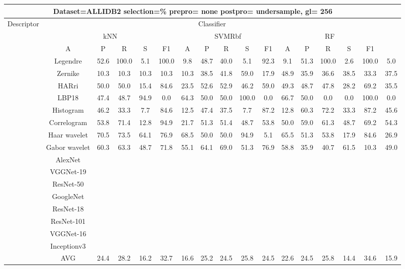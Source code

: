 \documentclass[12pt,italian]{article}
\begin{document}
\begin{tiny}
\begin{longtable}{lcccccccccccccccc}
\toprule
\multicolumn{16}{c}{Dataset=ALLIDB2 selection=\% prepro= none postpro= undersample, gl= 256} \\ 
\toprule
Descriptor & \multicolumn{15}{c}{Classifier} \\ 
& \multicolumn{5}{c}{kNN} & \multicolumn{5}{c}{SVMRbf} & \multicolumn{5}{c}{RF} \\ 
& A & P & R & S & F1 & A & P & R & S & F1 & A & P & R & S & F1 \\ 
\midrule
& Legendre & 52.6 & 100.0 &  5.1 & 100.0 &  9.8 & 48.7 & 40.0 &  5.1 & 92.3 &  9.1 & 51.3 & 100.0 &  2.6 & 100.0 &  5.0 \\ 
& Zernike & 10.3 & 10.3 & 10.3 & 10.3 & 10.3 & 38.5 & 41.8 & 59.0 & 17.9 & 48.9 & 35.9 & 36.6 & 38.5 & 33.3 & 37.5 \\ 
& HARri & 50.0 & 50.0 & 15.4 & 84.6 & 23.5 & 52.6 & 52.9 & 46.2 & 59.0 & 49.3 & 48.7 & 47.8 & 28.2 & 69.2 & 35.5 \\ 
& LBP18 & 47.4 & 48.7 & 94.9 &  0.0 & 64.3 & 50.0 & 50.0 & 100.0 &  0.0 & 66.7 & 50.0 &  0.0 &  0.0 & 100.0 &  0.0 \\ 
& Histogram & 46.2 & 33.3 &  7.7 & 84.6 & 12.5 & 47.4 & 37.5 &  7.7 & 87.2 & 12.8 & 60.3 & 72.2 & 33.3 & 87.2 & 45.6 \\ 
& Correlogram & 53.8 & 71.4 & 12.8 & 94.9 & 21.7 & 51.3 & 51.4 & 48.7 & 53.8 & 50.0 & 59.0 & 61.3 & 48.7 & 69.2 & 54.3 \\ 
& Haar wavelet & 70.5 & 73.5 & 64.1 & 76.9 & 68.5 & 50.0 & 50.0 & 94.9 &  5.1 & 65.5 & 51.3 & 53.8 & 17.9 & 84.6 & 26.9 \\ 
& Gabor wavelet & 60.3 & 63.3 & 48.7 & 71.8 & 55.1 & 64.1 & 69.0 & 51.3 & 76.9 & 58.8 & 35.9 & 40.7 & 61.5 & 10.3 & 49.0 \\ 
& AlexNet \\ 
& VGGNet-19 \\ 
& ResNet-50 \\ 
& GoogleNet \\ 
& ResNet-18 \\ 
& ResNet-101 \\ 
& VGGNet-16 \\ 
& Inceptionv3 \\ 
\hline
& AVG & 24.4 & 28.2 & 16.2 & 32.7 & 16.6 & 25.2 & 24.5 & 25.8 & 24.5 & 22.6 & 24.5 & 25.8 & 14.4 & 34.6 & 15.9 \\ 
\hline
\bottomrule
\end{longtable} 


\end{tiny}
\end{document}
